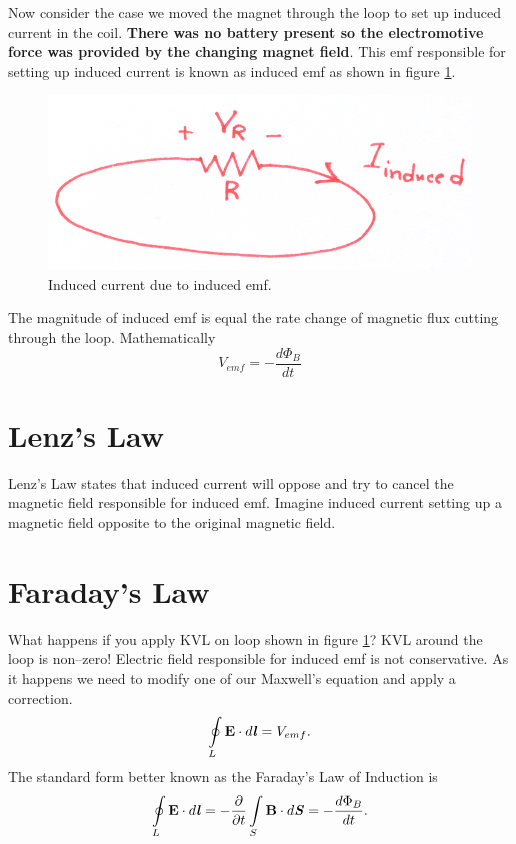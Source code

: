 \documentclass[12pt,a4paper]{article}
\begin{document}
Now consider the case we moved the magnet through the loop to set up induced current in the coil. \textbf{There was no battery present so the electromotive force was provided by the changing magnet field}. This emf responsible for setting up induced current is known as induced emf as shown in figure \ref{Induced-emf}.
\begin{figure}[H]
\centering
\includegraphics[scale=0.5]{InducedEMF.png}
\caption{Induced current due to induced emf.}
\label{Induced-emf}
\end{figure}
The magnitude of induced emf is equal the rate change of magnetic flux cutting through the loop. Mathematically
\begin{equation}
V_{emf}=-\dfrac{d\Phi_B}{dt}
\end{equation}
\section{Lenz's Law}
Lenz's Law states that induced current will oppose and try to cancel the magnetic field responsible for induced emf. Imagine induced current setting up a magnetic field opposite to the original magnetic field.
\section{Faraday's Law}
What happens if you apply KVL on loop shown in figure \ref{Induced-emf}? KVL around the loop is non--zero! Electric field responsible for induced emf is not conservative. As it happens we need to modify one of our Maxwell's equation and apply a correction.
\begin{equation}
\oint\limits_{L} \textbf{E}\cdot d\textbf{\textit{l}}=V_{emf}.
\end{equation}
The standard form better known as the Faraday's Law of Induction is
\begin{equation}
\oint\limits_{L} \textbf{E}\cdot d\textbf{\textit{l}}=-\dfrac{\partial}{\partial t}\int\limits_{S}\textbf{B}\cdot d\textbf{\textit{S}}=-\dfrac{d\Phi_B}{dt}.
\end{equation}
\end{document}

